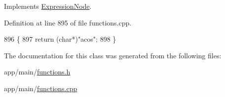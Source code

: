 Implements \hyperlink{classExpressionNode_a42a5e9562b0f645a19dcc83f698069b5}{Expression\+Node}.



Definition at line 895 of file functions.\+cpp.


\begin{DoxyCode}
896 \{
897     \textcolor{keywordflow}{return} (\textcolor{keywordtype}{char}*)\textcolor{stringliteral}{"acos"};
898 \}
\end{DoxyCode}


The documentation for this class was generated from the following files\+:\begin{DoxyCompactItemize}
\item 
app/main/\hyperlink{functions_8h}{functions.\+h}\item 
app/main/\hyperlink{functions_8cpp}{functions.\+cpp}\end{DoxyCompactItemize}
